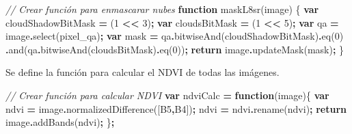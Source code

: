 \documentclass[
  12pt,
  letterpaper,
  twoside]{book}
\newenvironment{Shaded}{\begin{snugshade}}{\end{snugshade}}
\newcommand{\CommentTok}[1]{\textcolor[rgb]{0.56,0.35,0.01}{\textit{#1}}}
\newcommand{\ControlFlowTok}[1]{\textcolor[rgb]{0.13,0.29,0.53}{\textbf{#1}}}
\newcommand{\DecValTok}[1]{\textcolor[rgb]{0.00,0.00,0.81}{#1}}
\newcommand{\FunctionTok}[1]{\textcolor[rgb]{0.00,0.00,0.00}{#1}}
\newcommand{\KeywordTok}[1]{\textcolor[rgb]{0.13,0.29,0.53}{\textbf{#1}}}
\newcommand{\NormalTok}[1]{#1}
\newcommand{\OperatorTok}[1]{\textcolor[rgb]{0.81,0.36,0.00}{\textbf{#1}}}
\newcommand{\StringTok}[1]{\textcolor[rgb]{0.31,0.60,0.02}{#1}}
\begin{document}
\begin{Shaded}
\begin{Highlighting}[]
\CommentTok{// Crear función para enmascarar nubes}
\KeywordTok{function} \FunctionTok{maskL8sr}\NormalTok{(image) \{}
  \KeywordTok{var}\NormalTok{ cloudShadowBitMask }\OperatorTok{=}\NormalTok{ (}\DecValTok{1} \OperatorTok{\textless{}\textless{}} \DecValTok{3}\NormalTok{)}\OperatorTok{;}
  \KeywordTok{var}\NormalTok{ cloudsBitMask }\OperatorTok{=}\NormalTok{ (}\DecValTok{1} \OperatorTok{\textless{}\textless{}} \DecValTok{5}\NormalTok{)}\OperatorTok{;}
  \KeywordTok{var}\NormalTok{ qa }\OperatorTok{=}\NormalTok{ image}\OperatorTok{.}\FunctionTok{select}\NormalTok{(}\StringTok{\textquotesingle{}pixel\_qa\textquotesingle{}}\NormalTok{)}\OperatorTok{;}
  \KeywordTok{var}\NormalTok{ mask }\OperatorTok{=}\NormalTok{ qa}\OperatorTok{.}\FunctionTok{bitwiseAnd}\NormalTok{(cloudShadowBitMask)}\OperatorTok{.}\FunctionTok{eq}\NormalTok{(}\DecValTok{0}\NormalTok{)}
                 \OperatorTok{.}\FunctionTok{and}\NormalTok{(qa}\OperatorTok{.}\FunctionTok{bitwiseAnd}\NormalTok{(cloudsBitMask)}\OperatorTok{.}\FunctionTok{eq}\NormalTok{(}\DecValTok{0}\NormalTok{))}\OperatorTok{;}
  \ControlFlowTok{return}\NormalTok{ image}\OperatorTok{.}\FunctionTok{updateMask}\NormalTok{(mask)}\OperatorTok{;}
\NormalTok{\}}
\end{Highlighting}
\end{Shaded}

Se define la función para calcular el NDVI de todas las imágenes.

\begin{Shaded}
\begin{Highlighting}[]
\CommentTok{// Crear función para calcular NDVI}
\KeywordTok{var}\NormalTok{ ndviCalc }\OperatorTok{=} \KeywordTok{function}\NormalTok{(image)\{}
  \KeywordTok{var}\NormalTok{ ndvi }\OperatorTok{=}\NormalTok{ image}\OperatorTok{.}\FunctionTok{normalizedDifference}\NormalTok{([}\StringTok{\textquotesingle{}B5\textquotesingle{}}\OperatorTok{,}\StringTok{\textquotesingle{}B4\textquotesingle{}}\NormalTok{])}\OperatorTok{;}
\NormalTok{  ndvi }\OperatorTok{=}\NormalTok{ ndvi}\OperatorTok{.}\FunctionTok{rename}\NormalTok{(}\StringTok{\textquotesingle{}ndvi\textquotesingle{}}\NormalTok{)}\OperatorTok{;}
    \ControlFlowTok{return}\NormalTok{ image}\OperatorTok{.}\FunctionTok{addBands}\NormalTok{(ndvi)}\OperatorTok{;}
\NormalTok{\}}\OperatorTok{;}
\end{Highlighting}
\end{Shaded}
\end{document}
